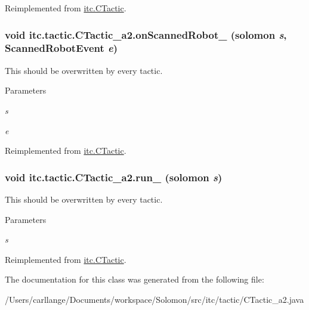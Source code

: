 Reimplemented from \hyperlink{classitc_1_1_c_tactic_a9a8d125f826667459758f2767c3bd957}{itc.CTactic}.\hypertarget{classitc_1_1tactic_1_1_c_tactic__a2_a2448157d91e699740cf8a99f99b0c456}{
\subsubsection[{onScannedRobot\_\-}]{\setlength{\rightskip}{0pt plus 5cm}void itc.tactic.CTactic\_\-a2.onScannedRobot\_\- ({\bf solomon} {\em s}, \/  ScannedRobotEvent {\em e})}}
\label{classitc_1_1tactic_1_1_c_tactic__a2_a2448157d91e699740cf8a99f99b0c456}
This should be overwritten by every tactic. 
\begin{DoxyParams}{Parameters}
\item[{\em s}]\item[{\em e}]\end{DoxyParams}


Reimplemented from \hyperlink{classitc_1_1_c_tactic_a63a5a64ff30293061e37eca71fb77a96}{itc.CTactic}.\hypertarget{classitc_1_1tactic_1_1_c_tactic__a2_a71e36f42565ca1436eb1ee71f3d94312}{
\subsubsection[{run\_\-}]{\setlength{\rightskip}{0pt plus 5cm}void itc.tactic.CTactic\_\-a2.run\_\- ({\bf solomon} {\em s})}}
\label{classitc_1_1tactic_1_1_c_tactic__a2_a71e36f42565ca1436eb1ee71f3d94312}
This should be overwritten by every tactic. 
\begin{DoxyParams}{Parameters}
\item[{\em s}]\end{DoxyParams}


Reimplemented from \hyperlink{classitc_1_1_c_tactic_ae5f5c51a6e04d22bc298dbdec4080770}{itc.CTactic}.

The documentation for this class was generated from the following file:\begin{DoxyCompactItemize}
\item 
/Users/carllange/Documents/workspace/Solomon/src/itc/tactic/CTactic\_\-a2.java\end{DoxyCompactItemize}
